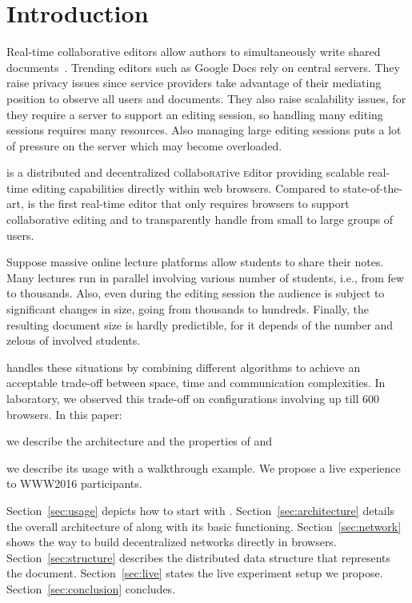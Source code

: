 
\section{Introduction}
\label{sec:introduction}

Real-time collaborative editors allow authors to simultaneously write shared
documents~\cite{greenberg1994real}. Trending editors such as Google Docs rely on
central servers. They raise privacy issues since service providers take
advantage of their mediating position to observe all users and documents. They
also raise scalability issues, for they require a server to support an editing
session, so handling many editing sessions requires many resources. Also
managing large editing sessions puts a lot of pressure on the server which may
become overloaded.


\CRATE is a distributed and decentralized \textsc{c}ollabo\textsc{rat}ive
\textsc{e}ditor providing scalable real-time editing capabilities directly
within web browsers. Compared to state-of-the-art, \CRATE is the first real-time
editor that only requires browsers to support collaborative editing and to
transparently handle from small to large groups of users.

Suppose massive online lecture platforms allow students to share their
notes. Many lectures run in parallel involving various number of students, i.e.,
from few to thousands. Also, even during the editing session the audience is subject
to significant changes in size, going from thousands to hundreds. Finally, the
resulting document size is hardly predictible, for it depends of the number and
zelous of involved students.

\CRATE handles these situations by combining different algorithms to
achieve an acceptable trade-off between space, time and communication
complexities. In laboratory, we observed this trade-off on configurations
involving up till 600 browsers. In this paper:
\begin{inparaenum}[(i)]
\item we describe the architecture and the properties of \CRATE and
\item we describe its usage with a walkthrough example. We propose
  a live experience to WWW2016 participants.
\end{inparaenum}

Section~\ref{sec:usage} depicts how to start with \CRATE.
Section~\ref{sec:architecture} details the overall architecture of \CRATE along
with its basic functioning. Section~\ref{sec:network} shows the way to build
decentralized networks directly in browsers.  Section~\ref{sec:structure}
describes the distributed data structure that represents the document.
Section~\ref{sec:live} states the live experiment setup we
propose. Section~\ref{sec:conclusion} concludes.


